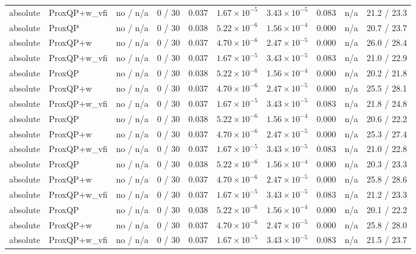 \begin{tabular}{llllllllll}
absolute & ProxQP+w\_vfi & no / n/a & 0 / 30 & 0.037 & $1.67\times 10^{-5}$ & $3.43\times 10^{-5}$ & 0.083 & n/a & 21.2 / 23.3 \\
absolute & ProxQP & no / n/a & 0 / 30 & 0.038 & $5.22\times 10^{-6}$ & $1.56\times 10^{-4}$ & 0.000 & n/a & 20.7 / 23.7 \\
absolute & ProxQP+w & no / n/a & 0 / 30 & 0.037 & $4.70\times 10^{-6}$ & $2.47\times 10^{-5}$ & 0.000 & n/a & 26.0 / 28.4 \\
absolute & ProxQP+w\_vfi & no / n/a & 0 / 30 & 0.037 & $1.67\times 10^{-5}$ & $3.43\times 10^{-5}$ & 0.083 & n/a & 21.0 / 22.9 \\
absolute & ProxQP & no / n/a & 0 / 30 & 0.038 & $5.22\times 10^{-6}$ & $1.56\times 10^{-4}$ & 0.000 & n/a & 20.2 / 21.8 \\
absolute & ProxQP+w & no / n/a & 0 / 30 & 0.037 & $4.70\times 10^{-6}$ & $2.47\times 10^{-5}$ & 0.000 & n/a & 25.5 / 28.1 \\
absolute & ProxQP+w\_vfi & no / n/a & 0 / 30 & 0.037 & $1.67\times 10^{-5}$ & $3.43\times 10^{-5}$ & 0.083 & n/a & 21.8 / 24.8 \\
absolute & ProxQP & no / n/a & 0 / 30 & 0.038 & $5.22\times 10^{-6}$ & $1.56\times 10^{-4}$ & 0.000 & n/a & 20.6 / 22.2 \\
absolute & ProxQP+w & no / n/a & 0 / 30 & 0.037 & $4.70\times 10^{-6}$ & $2.47\times 10^{-5}$ & 0.000 & n/a & 25.3 / 27.4 \\
absolute & ProxQP+w\_vfi & no / n/a & 0 / 30 & 0.037 & $1.67\times 10^{-5}$ & $3.43\times 10^{-5}$ & 0.083 & n/a & 21.0 / 22.8 \\
absolute & ProxQP & no / n/a & 0 / 30 & 0.038 & $5.22\times 10^{-6}$ & $1.56\times 10^{-4}$ & 0.000 & n/a & 20.3 / 23.3 \\
absolute & ProxQP+w & no / n/a & 0 / 30 & 0.037 & $4.70\times 10^{-6}$ & $2.47\times 10^{-5}$ & 0.000 & n/a & 25.8 / 28.6 \\
absolute & ProxQP+w\_vfi & no / n/a & 0 / 30 & 0.037 & $1.67\times 10^{-5}$ & $3.43\times 10^{-5}$ & 0.083 & n/a & 21.2 / 23.3 \\
absolute & ProxQP & no / n/a & 0 / 30 & 0.038 & $5.22\times 10^{-6}$ & $1.56\times 10^{-4}$ & 0.000 & n/a & 20.1 / 22.2 \\
absolute & ProxQP+w & no / n/a & 0 / 30 & 0.037 & $4.70\times 10^{-6}$ & $2.47\times 10^{-5}$ & 0.000 & n/a & 25.8 / 28.0 \\
absolute & ProxQP+w\_vfi & no / n/a & 0 / 30 & 0.037 & $1.67\times 10^{-5}$ & $3.43\times 10^{-5}$ & 0.083 & n/a & 21.5 / 23.7 \\

\end{tabular}
